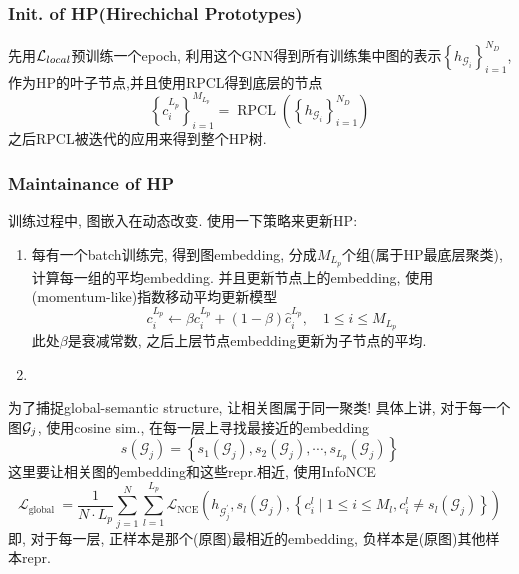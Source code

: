 \documentclass{article}
\begin{document}
\subsubsection{Init. of HP(Hirechichal Prototypes)}

先用$\cal{L}_{local}$预训练一个epoch, 利用这个GNN得到所有训练集中图的表示$\left\{h_{\mathcal{G}_{i}}\right\}_{i=1}^{N_{D}}$, 作为HP的叶子节点,并且使用RPCL得到底层的节点
\begin{equation}
    \left\{c_{i}^{L_{p}}\right\}_{i=1}^{M_{L_{p}}}=\operatorname{RPCL}\left(\left\{h_{\mathcal{G}_{i}}\right\}_{i=1}^{N_{D}}\right)
\end{equation}
之后RPCL被迭代的应用来得到整个HP树.

\subsubsection{Maintainance of HP}

训练过程中, 图嵌入在动态改变. 使用一下策略来更新HP:
\begin{enumerate}
    \item 每有一个batch训练完, 得到图embedding, 分成$M_{L_p}$个组(属于HP最底层聚类), 计算每一组的平均embedding. 并且更新节点上的embedding, 使用(momentum-like)指数移动平均更新模型
    \begin{equation}
        c_{i}^{L_{p}} \leftarrow \beta c_{i}^{L_{p}}+(1-\beta) \widehat{c}_{i}^{L_{p}}, \quad 1 \leqslant i \leqslant M_{L_{p}}
    \end{equation}
    此处$\beta$是衰减常数, 之后上层节点embedding更新为子节点的平均.
    \item 
\end{enumerate}

为了捕捉global-semantic structure, 让相关图属于同一聚类! 具体上讲, 对于每一个图$\cal{G}_j$, 使用cosine sim., 在每一层上寻找最接近的embedding
$$
s\left(\mathcal{G}_{j}\right)=\left\{s_{1}\left(\mathcal{G}_{j}\right), s_{2}\left(\mathcal{G}_{j}\right), \cdots, s_{L_{p}}\left(\mathcal{G}_{j}\right)\right\}
$$
这里要让相关图的embedding和这些repr.相近, 使用InfoNCE
\begin{equation}
    \mathcal{L}_{\text {global }}=\frac{1}{N \cdot L_{p}} \sum_{j=1}^{N} \sum_{l=1}^{L_{p}} \mathcal{L}_{\mathrm{NCE}}\left(h_{\mathcal{G}_{j}^{\prime}}, s_{l}\left(\mathcal{G}_{j}\right),\left\{c_{i}^{l} \mid 1 \leqslant i \leqslant M_{l}, c_{i}^{l} \neq s_{l}\left(\mathcal{G}_{j}\right)\right\}\right)
\end{equation}
即, 对于每一层, 正样本是那个(原图)最相近的embedding, 负样本是(原图)其他样本repr.
\end{document}
